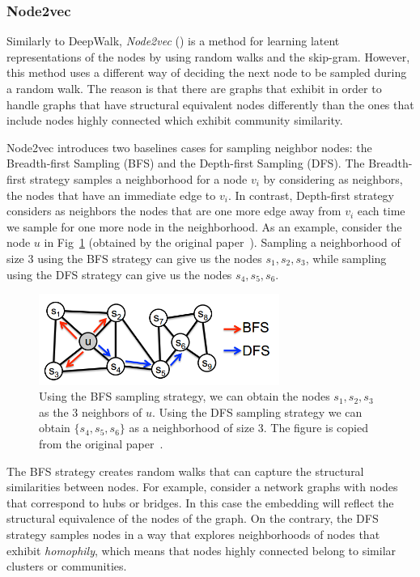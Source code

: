 \subsubsection{Node2vec}

Similarly to DeepWalk, \emph{Node2vec} (\cite{grover2016node2vec}) is a method
for learning latent representations of the nodes by using random walks and the
skip-gram. However, this method uses a different way of deciding the next node 
to be sampled during a random walk. The reason is that there are graphs that 
exhibit in order to handle graphs that have 
structural equivalent nodes differently than the ones that include nodes 
highly connected which exhibit community similarity.

Node2vec introduces two baselines cases for sampling neighbor nodes: the
Breadth-first Sampling (BFS) and the Depth-first Sampling (DFS).
The Breadth-first strategy samples a neighborhood for a node $v_i$ by
considering as neighbors, the nodes that have an immediate edge to $v_i$.
In contrast, Depth-first strategy considers as neighbors the nodes that are
one more edge away from $v_i$ each time we sample for one more node in the 
neighborhood. As an example, consider the node $u$ in 
Fig~\ref{sampling_strategies} (obtained by the original 
paper~\cite{grover2016node2vec}). Sampling a neighborhood of size 3 using the 
BFS strategy can give us the nodes $s_1, s_2, s_3$, while sampling using the DFS 
strategy can give us the nodes $s_4, s_5, s_6$.
\begin{figure}
\begin{center}
\includegraphics[width=0.7\textwidth]{figures/sampling.png}
\end{center}
\caption{Using the BFS sampling strategy, we can obtain the nodes
$s_1, s_2, s_3$ as the 3 neighbors of $u$. Using the DFS sampling strategy we
can obtain $\{s_4, s_5, s_6\}$ as a neighborhood of size 3. The figure is copied 
from the original paper~\cite{grover2016node2vec}.}
\label{sampling_strategies}
\end{figure}
The BFS strategy creates random walks that can capture the structural similarities
between nodes. For example, consider a network graphs with nodes that correspond
to hubs or bridges. In this case the embedding will reflect the structural
equivalence of the nodes of the graph.
On the contrary, the DFS strategy samples nodes in a way that explores
neighborhoods of nodes that exhibit \emph{homophily}, which means that nodes
highly connected belong to similar clusters or communities.

